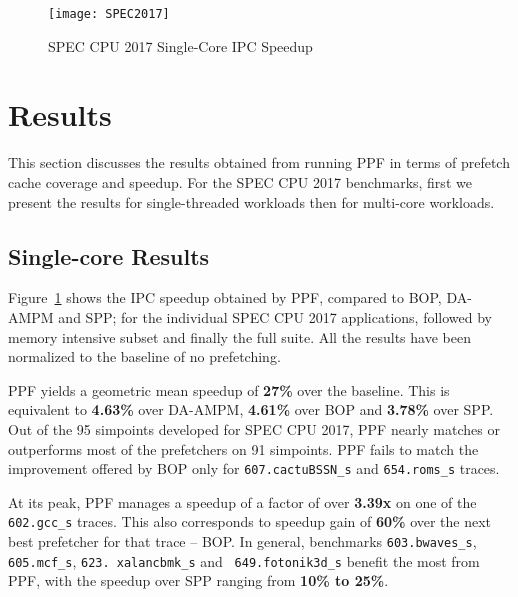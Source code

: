 \begin{figure}[ht]
\texttt{[image: SPEC2017]}
\caption{SPEC CPU 2017 Single-Core IPC Speedup}
\label{Fig:SPEC2017_1core}
\end{figure}

\section{Results}
\label{Results}

This section discusses the results obtained from running PPF in terms of
prefetch cache coverage and speedup. For the SPEC CPU 2017 benchmarks, first
we present the results for single-threaded workloads then for multi-core
workloads.

\subsection{Single-core Results}
\label{Results-Single}


Figure~\ref{Fig:SPEC2017_1core} shows the IPC speedup obtained by PPF,
compared to BOP, DA-AMPM and SPP; for the individual SPEC CPU 2017 
applications, followed by memory intensive subset and finally the full
suite. All the results have been normalized to the baseline of no prefetching.


PPF yields a geometric mean speedup of \textbf{27\%} over the baseline. 
This is equivalent to \textbf{4.63\%} over DA-AMPM, \textbf{4.61\%} over BOP 
and \textbf{3.78\%} over SPP. Out of the 95 simpoints developed for SPEC 
CPU 2017, PPF nearly matches or outperforms most of the prefetchers on 91 
simpoints. PPF fails to match the improvement offered by BOP only for 
{\tt 607.cactuBSSN\_s} and {\tt 654.roms\_s} traces.

At its peak, PPF manages a speedup of a factor of over \textbf{3.39x} on one of the
{\tt 602.gcc\_s} traces. This also corresponds to speedup gain of
\textbf{60\%} over the next best prefetcher for that trace -- BOP. In general, benchmarks
{\tt 603.bwaves\_s}, {\tt 605.mcf\_s}, {\tt 623. xalancbmk\_s} and {\tt
649.fotonik3d\_s} benefit the most from PPF, with the speedup over SPP ranging
from \textbf{10\% to 25\%}.

